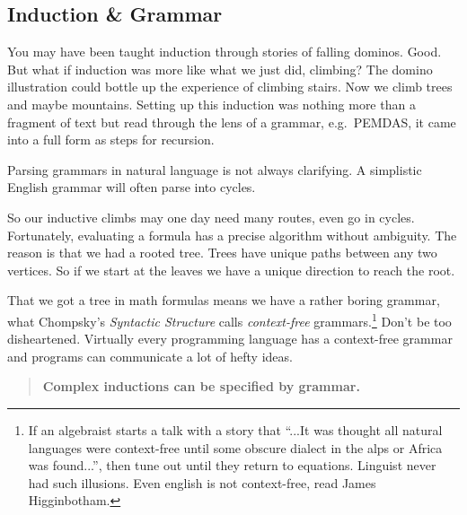 \subsection{Induction \& Grammar}
You may have been taught induction through stories of falling 
dominos.  Good.  But what if induction was more like what we just did, climbing?
The domino illustration could bottle up the experience of climbing stairs.  
Now we climb trees and maybe mountains.
Setting up this induction was nothing more than a fragment of text but 
read through the lens of a grammar, e.g.\ PEMDAS, it came into a full form
as steps for recursion.

Parsing grammars in natural language is not always clarifying.  A simplistic
English grammar will often parse into cycles.
\begin{center}
\end{center}
So our inductive climbs may one day need many routes, even go in cycles.
Fortunately, evaluating a formula has a precise algorithm without ambiguity. The
reason is that we had a rooted tree.  Trees have unique paths between any two
vertices. So if we start at the leaves we have a unique direction to reach the
root. 



That we got a tree in math formulas means we have a rather boring grammar, 
what Chompsky's \emph{Syntactic Structure} calls
\emph{context-free} grammars.\footnote{
    If an algebraist starts a talk with a story that ``...It was thought  all natural 
    languages were context-free until some obscure dialect in the alps or Africa was found...'', 
    then tune out until they return to equations.  
    Linguist never had such illusions. Even english is not context-free, read  James Higginbotham.} 
Don't be too disheartened.  Virtually every programming language has a 
context-free grammar and programs can communicate a lot of hefty ideas. 

\begin{quote}
    \textbf{Complex inductions can be specified by grammar.}
\end{quote}
